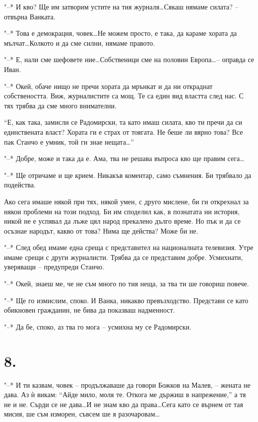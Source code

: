 \documentclass[ebook,openany,12pt]{memoir}
\begin{document}
"--* И кво? Ще им затворим устите на тия журналя\ldots Сякаш нямаме силата? – отвърна Ванката.

"--* Това е демокрация, човек\ldots Не можем просто, е така, да караме хората да мълчат\ldots Колкото и да сме силни, нямаме правото.

"--* Е, нали сме шефовете ние\ldots Собственици сме на половин Европа\ldots – оправда се Иван.

"--* Окей, обаче нищо не пречи хората да мрънкат и да ни откраднат собствеността. Виж, журналистите са мощ. Те са един вид властта след нас. С тях трябва да сме много внимателни.

``Е, как така, замисли се Радомирски, та като имаш силата, кво ти пречи да си единствената власт? Хората ги е страх от тоягата. Не беше ли вярно това? Все пак Станчо е умник, той ги знае нещата\ldots''

"--* Добре, може и така да е. Ама, тва не решава въпроса кво ще правим сега\ldots

"--* Ще отричаме и ще крием. Никакъв коментар, само съмнения. Би трябвало да подейства.

Ако сега имаше някой при тях, някой умен, с друго мислене, би ги открехнал за някои проблеми на този подход. Би им споделил как, в познатата ни история, никой не е успявал да лъже цял народ прекалено дълго време. Но пък и да се осъзнае народът, какво от това? Нима ще действа? Може би не.

"--* След обед имаме една среща с представител на националната телевизия. Утре имаме срещи с други журналисти. Трябва да се представим добре. Усмихнати, уверяващи – предупреди Станчо.

"--* Окей, знаеш ме, че не съм много по тия неща, за тва ти ше говориш повече.

"--* Ще го измислим, споко. И Ванка, никакво превъзходство. Представи се като обикновен гражданин, не бива да показваш надменност.

"--* Да бе, споко, аз тва го мога – усмихна му се Радомирски.

\section*{8.}

"--* И ти казвам, човек – продължаваше да говори Божков на Малев, – жената не дава. Аз ѝ викам: ``Айде мило, моля те. Откога ме държиш в напрежение,'' а тя не и не. Сърди се не дава\ldots И не знам кво да права\ldots Сега като се върнем от тая мисия, ше съм изморен, съвсем ше я разочаровам\ldots
\end{document}
